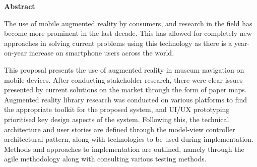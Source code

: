 \begin{center}        
    \Large
    \textbf{Abstract}\\
\end{center}

The use of mobile augmented reality by consumers, and research in the field has become more prominent in the last decade. This has allowed for completely new approaches in solving current problems using this technology as there is a year-on-year increase on smartphone users across the world. 

This proposal presents the use of augmented reality in museum navigation on mobile devices. After conducting stakeholder research, there were clear issues presented by current solutions on the market through the form of paper maps. Augmented reality library research was conducted on various platforms to find the appropriate toolkit for the proposed system, and UI/UX prototyping prioritised key design aspects of the system. Following this, the technical architecture and user stories are defined through the model-view controller architectural pattern, along with technologies to be used during implementation. Methods and approaches to implementation are outlined, namely through the agile methodology along with consulting various testing methods.

\afterpage{\blankpage}